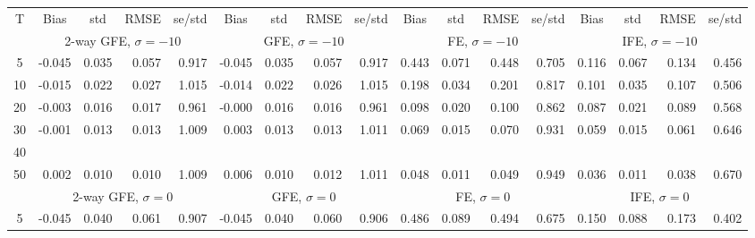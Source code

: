 \documentclass{article}
\begin{document}
 
\begin{tabular}{c r r r r r r r r r r r r r r r r} 
\toprule 
T & \multicolumn{1}{c}{ Bias } & \multicolumn{1}{c}{ std } & \multicolumn{1}{c}{ RMSE } & \multicolumn{1}{c}{ se/std } & \multicolumn{1}{c}{ Bias } & \multicolumn{1}{c}{ std } & \multicolumn{1}{c}{ RMSE } & \multicolumn{1}{c}{ se/std } & \multicolumn{1}{c}{ Bias } & \multicolumn{1}{c}{ std } & \multicolumn{1}{c}{ RMSE } & \multicolumn{1}{c}{ se/std } & \multicolumn{1}{c}{ Bias } & \multicolumn{1}{c}{ std } & \multicolumn{1}{c}{ RMSE } & \multicolumn{1}{c}{ se/std }\\[2pt]
 & \multicolumn{ 4 }{c}{ 2-way GFE, $\sigma{=}-1$0} & \multicolumn{ 4 }{c}{ GFE, $\sigma{=}-1$0} & \multicolumn{ 4 }{c}{ FE, $\sigma{=}-1$0} & \multicolumn{ 4 }{c}{ IFE, $\sigma{=}-1$0}\\[-3pt]
 \cmidrule(lr){2-5}  \cmidrule(lr){6-9}  \cmidrule(lr){10-13}  \cmidrule(lr){14-17}
5 &     -0.045 &      0.035 &      0.057 &      0.917 &     -0.045 &      0.035 &      0.057 &      0.917 &      0.443 &      0.071 &      0.448 &      0.705 &      0.116 &      0.067 &      0.134 &      0.456\\
10 &     -0.015 &      0.022 &      0.027 &      1.015 &     -0.014 &      0.022 &      0.026 &      1.015 &      0.198 &      0.034 &      0.201 &      0.817 &      0.101 &      0.035 &      0.107 &      0.506\\
20 &     -0.003 &      0.016 &      0.017 &      0.961 &     -0.000 &      0.016 &      0.016 &      0.961 &      0.098 &      0.020 &      0.100 &      0.862 &      0.087 &      0.021 &      0.089 &      0.568\\
30 &     -0.001 &      0.013 &      0.013 &      1.009 &      0.003 &      0.013 &      0.013 &      1.011 &      0.069 &      0.015 &      0.070 &      0.931 &      0.059 &      0.015 &      0.061 &      0.646\\
40\\
50 &      0.002 &      0.010 &      0.010 &      1.009 &      0.006 &      0.010 &      0.012 &      1.011 &      0.048 &      0.011 &      0.049 &      0.949 &      0.036 &      0.011 &      0.038 &      0.670\\[0pt]
 & \multicolumn{ 4 }{c}{ 2-way GFE, $\sigma{=}0$} & \multicolumn{ 4 }{c}{ GFE, $\sigma{=}0$} & \multicolumn{ 4 }{c}{ FE, $\sigma{=}0$} & \multicolumn{ 4 }{c}{ IFE, $\sigma{=}0$}\\[-3pt]
 \cmidrule(lr){2-5}  \cmidrule(lr){6-9}  \cmidrule(lr){10-13}  \cmidrule(lr){14-17}
5 &     -0.045 &      0.040 &      0.061 &      0.907 &     -0.045 &      0.040 &      0.060 &      0.906 &      0.486 &      0.089 &      0.494 &      0.675 &      0.150 &      0.088 &      0.173 &      0.402\\

\end{tabular}
\end{document}
